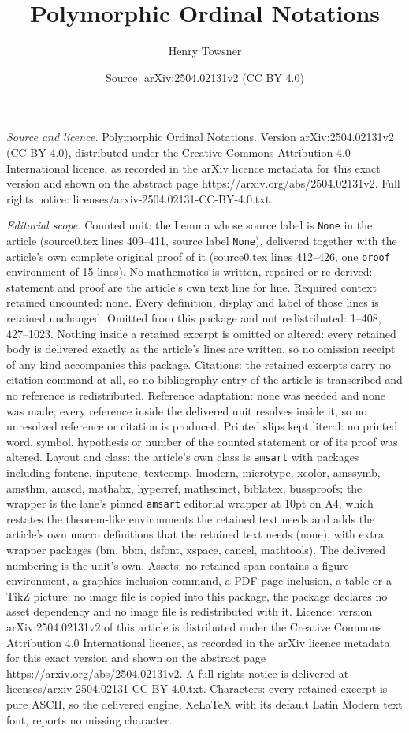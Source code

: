 \documentclass[10pt,a4paper]{amsart}
\title[Polymorphic Ordinal Notations]{Polymorphic Ordinal Notations}
\author{Henry Towsner}
\date{Source: arXiv:2504.02131v2 (CC BY 4.0)}
\begin{document}
\maketitle

\noindent\emph{Source and licence.} Polymorphic Ordinal Notations. Version arXiv:2504.02131v2 (CC BY 4.0), distributed under the Creative Commons Attribution 4.0 International licence, as recorded in the arXiv licence metadata for this exact version and shown on the abstract page https://arxiv.org/abs/2504.02131v2. Full rights notice: licenses/arxiv-2504.02131-CC-BY-4.0.txt.\par\smallskip

\noindent\textit{Editorial scope.} Counted unit: the Lemma whose source label is \texttt{None} in the article (source0.tex lines 409--411, source label \texttt{None}), delivered together with the article's own complete original proof of it (source0.tex lines 412--426, one \texttt{proof} environment of 15 lines). No mathematics is written, repaired or re-derived: statement and proof are the article's own text line for line. Required context retained uncounted: none. Every definition, display and label of those lines is retained unchanged. Omitted from this package and not redistributed: 1--408, 427--1023. Nothing inside a retained excerpt is omitted or altered: every retained body is delivered exactly as the article's lines are written, so no omission receipt of any kind accompanies this package. Citations: the retained excerpts carry no citation command at all, so no bibliography entry of the article is transcribed and no reference is redistributed. Reference adaptation: none was needed and none was made; every reference inside the delivered unit resolves inside it, so no unresolved reference or citation is produced. Printed slips kept literal: no printed word, symbol, hypothesis or number of the counted statement or of its proof was altered. Layout and class: the article's own class is \texttt{amsart} with packages including fontenc, inputenc, textcomp, lmodern, microtype, xcolor, amssymb, amsthm, amscd, mathabx, hyperref, mathscinet, biblatex, bussproofs; the wrapper is the lane's pinned \texttt{amsart} editorial wrapper at 10pt on A4, which restates the theorem-like environments the retained text needs and adds the article's own macro definitions that the retained text needs (none), with extra wrapper packages (bm, bbm, dsfont, xspace, cancel, mathtools). The delivered numbering is the unit's own. Assets: no retained span contains a figure environment, a graphics-inclusion command, a PDF-page inclusion, a table or a TikZ picture; no image file is copied into this package, the package declares no asset dependency and no image file is redistributed with it. Licence: version arXiv:2504.02131v2 of this article is distributed under the Creative Commons Attribution 4.0 International licence, as recorded in the arXiv licence metadata for this exact version and shown on the abstract page https://arxiv.org/abs/2504.02131v2. A full rights notice is delivered at licenses/arxiv-2504.02131-CC-BY-4.0.txt. Characters: every retained excerpt is pure ASCII, so the delivered engine, XeLaTeX with its default Latin Modern text font, reports no missing character.
\end{document}
